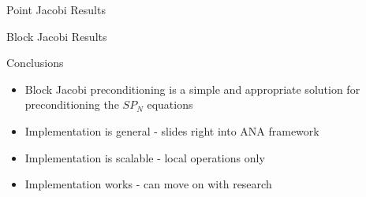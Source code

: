 \documentclass{beamer}
\begin{document}
\begin{frame}{Point Jacobi Results}
  
\end{frame}

\begin{frame}{Block Jacobi Results}
  
\end{frame}

\begin{frame}{Conclusions}

  \begin{itemize}
  \item Block Jacobi preconditioning is a simple and appropriate
    solution for preconditioning the $SP_N$ equations
  \item Implementation is general - slides right into ANA framework
  \item Implementation is scalable - local operations only
  \item Implementation works - can move on with research
  \end{itemize}

\end{frame}

\end{document}
